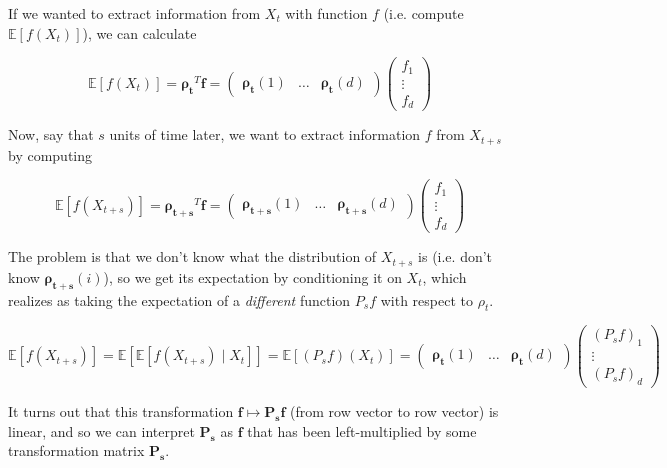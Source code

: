 \documentclass{article}
\begin{document}
  \begin{example}
    If we wanted to extract information from $X_t$ with function $f$ (i.e. compute $\mathbb{E}[f(X_t)]$), we can calculate 

      \[\mathbb{E}[f(X_t)] = \boldsymbol{\rho_t}^T \mathbf{f} =  \begin{pmatrix} \boldsymbol{\rho_t} (1) & \ldots & \boldsymbol{\rho_t} (d) \end{pmatrix} \begin{pmatrix} f_1 \\ \vdots \\ f_d \end{pmatrix}\] 

    Now, say that $s$ units of time later, we want to extract information $f$ from $X_{t + s}$ by computing 

      \[\mathbb{E}[f(X_{t + s})] = \boldsymbol{\rho_{t + s}}^T \mathbf{f} = \begin{pmatrix} \boldsymbol{\rho_{t + s}} (1) & \ldots &  \boldsymbol{\rho_{t + s}} (d) \end{pmatrix} \begin{pmatrix} f_1 \\ \vdots \\ f_d \end{pmatrix}\]

    The problem is that we don't know what the distribution of $X_{t + s}$ is (i.e. don't know $\boldsymbol{\rho_{t + s}} (i)$), so we get its expectation by conditioning it on $X_t$, which realizes as taking the expectation of a \textit{different} function $P_s f$ with respect to $\rho_t$. 

      \[\mathbb{E}[f(X_{t + s})] = \mathbb{E}[ \mathbb{E}[ f(X_{t + s}) \mid X_t]] = \mathbb{E}[(P_s f)(X_t)] = \begin{pmatrix} \boldsymbol{\rho_t} (1) & \ldots & \boldsymbol{\rho_t} (d) \end{pmatrix} \begin{pmatrix} (P_s f)_1 \\ \vdots \\(P_s f)_d \end{pmatrix}\]

    It turns out that this transformation $\mathbf{f} \mapsto \mathbf{P_s} \mathbf{f}$ (from row vector to row vector) is linear, and so we can interpret $\mathbf{P_s}$ as $\mathbf{f}$ that has been left-multiplied by some transformation matrix $\mathbf{P_s}$. 


\end{example}
\end{document}
